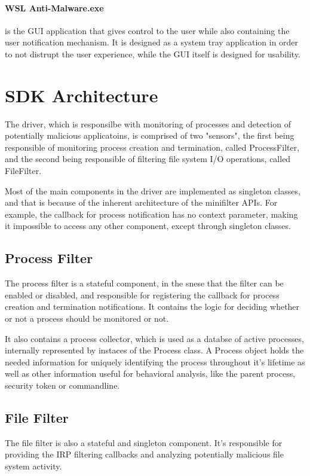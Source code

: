         \paragraph{WSL Anti-Malware.exe}
        is the GUI application that gives control to the user while also containing the user notification mechanism. It is designed as a system
        tray application in order to not distrupt the user experience, while the GUI itself is designed for usability.

    \section{SDK Architecture}
        The driver, which is responsilbe with monitoring of processes and detection of potentially malicious applicatoins, is comprised of
        two "sensors", the first being responsible of monitoring process creation and termination, called ProcessFilter, and the second being
        responsible of filtering file system I/O operations, called FileFilter.

        Most of the main components in the driver are implemented as singleton classes, and that is because of the inherent architecture of
        the minifilter APIs. For example, the callback for process notification has no context parameter, making it impossible to access
        any other component, except through singleton classes.

        \subsection{Process Filter}
        The process filter is a stateful component, in the snese that the filter can be enabled or disabled, and responsible for registering
        the callback for process creation and termination notifications. It contains the logic for deciding whether or not a process should be
        monitored or not.

        It also contains a process collector, which is used as a databse of active processes, internally represented by instaces of the Process
        class. A Process object holds the needed information for uniquely identifying the process throughout it's lifetime as well as other
        information useful for behavioral analysis, like the parent process, security token or commandline.

        \subsection{File Filter}
        The file filter is also a stateful and singleton component. It's responsible for providing the IRP filtering callbacks and analyzing
        potentially malicious file system activity.

